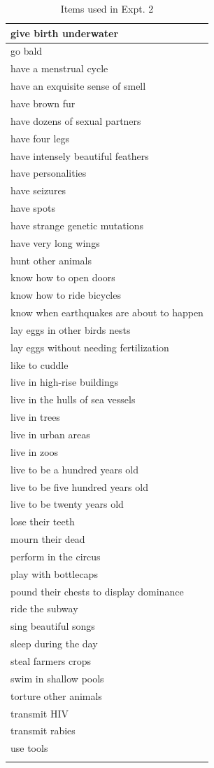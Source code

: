 \documentclass[,man,floatsintext]{apa6}
\theoremstyle{definition}
\theoremstyle{definition}
\theoremstyle{definition}
\theoremstyle{remark}
\begin{document}
\begin{longtable}{ |p{3in}|}
   \hline
give birth underwater \\ 
   \hline
go bald \\ 
   \hline
have a menstrual cycle \\ 
   \hline
have an exquisite sense of smell \\ 
   \hline
have brown fur \\ 
   \hline
have dozens of sexual partners \\ 
   \hline
have four legs \\ 
   \hline
have intensely beautiful feathers \\ 
   \hline
have personalities \\ 
   \hline
have seizures \\ 
   \hline
have spots \\ 
   \hline
have strange genetic mutations \\ 
   \hline
have very long wings \\ 
   \hline
hunt other animals \\ 
   \hline
know how to open doors \\ 
   \hline
know how to ride bicycles \\ 
   \hline
know when earthquakes are about to happen \\ 
   \hline
lay eggs in other birds nests \\ 
   \hline
lay eggs without needing fertilization \\ 
   \hline
like to cuddle \\ 
   \hline
live in high-rise buildings \\ 
   \hline
live in the hulls of sea vessels \\ 
   \hline
live in trees \\ 
   \hline
live in urban areas \\ 
   \hline
live in zoos \\ 
   \hline
live to be a hundred years old \\ 
   \hline
live to be five hundred years old \\ 
   \hline
live to be twenty years old \\ 
   \hline
lose their teeth \\ 
   \hline
mourn their dead \\ 
   \hline
perform in the circus \\ 
   \hline
play with bottlecaps \\ 
   \hline
pound their chests to display dominance \\ 
   \hline
ride the subway \\ 
   \hline
sing beautiful songs \\ 
   \hline
sleep during the day \\ 
   \hline
steal farmers crops \\ 
   \hline
swim in shallow pools \\ 
   \hline
torture other animals \\ 
   \hline
transmit HIV \\ 
   \hline
transmit rabies \\ 
   \hline
use tools \\ 
   \hline
\hline
\caption{Items used in Expt. 2} 
\end{longtable}
\endgroup
\end{document}
